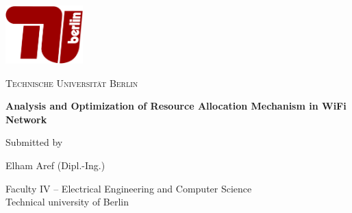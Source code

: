 
\begin{titlepage}
  \begin{center}
	  


	\centering
	\includegraphics[width=3cm]{figures/tub.pdf}\\
	\vspace{0.8em}
	\LARGE 

	\textsc{Technische Universit\"at Berlin}

    \vspace{1cm}

    \sffamily \LARGE \textbf{Analysis and Optimization of Resource Allocation Mechanism in WiFi Network}

    \vspace{1.5cm}





    \normalsize Submitted by

    \vspace{.1cm}

    \large Elham Aref (Dipl.-Ing.)

    \vspace{.8cm}



    \normalsize Faculty  IV -- Electrical Engineering and Computer Science\\
    \normalsize Technical university of Berlin\\


\end{center}
\end{titlepage}
